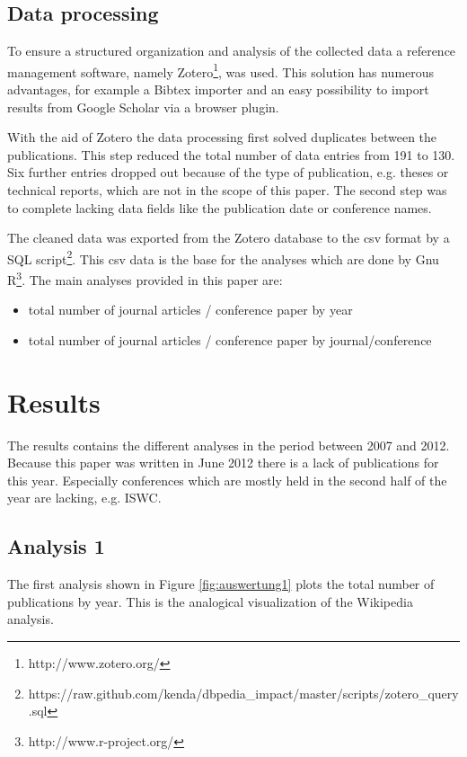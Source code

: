 \documentclass[english]{lni}
\begin{document}
\subsection{Data processing}
\label{sec-2-2}

   To ensure a structured organization and analysis of the collected data a
   reference management software, namely Zotero\footnote{http://www.zotero.org/ }, was used. This solution
   has numerous advantages, for example a Bibtex importer and an easy possibility to import
   results from Google Scholar via a browser plugin.

   With the aid of Zotero the data processing first solved duplicates between
   the publications. This step reduced the total number of data entries from 191
   to 130. Six further entries dropped out because of the type of publication,
   e.g. theses or technical reports, which are not in the scope of this
   paper. The second step was to complete lacking data fields like the
   publication date or conference names.

   The cleaned data was exported from the Zotero database to the csv format by a
   SQL script\footnote{https://raw.github.com/kenda/dbpedia\_{}impact/master/scripts/zotero\_{}query.sql }. This csv data is the base for the analyses which are done by
   Gnu R\footnote{http://www.r-project.org/ }. The main analyses provided in this paper are:
\begin{itemize}
\item total number of journal articles / conference paper by year
\item total number of journal articles / conference paper by journal/conference
\end{itemize}
\section{Results}
\label{sec-3}

  The results contains the different analyses in the period between 2007
  and 2012. Because this paper was written in June 2012 there is a lack of
  publications for this year. Especially conferences which are mostly held in the
  second half of the year are lacking, e.g. ISWC.
\subsection{Analysis 1}
\label{sec-3-1}

   The first analysis shown in Figure \ref{fig:auswertung1} plots the total
   number of publications by year. This is the analogical visualization of the
   Wikipedia analysis.
\end{document}
